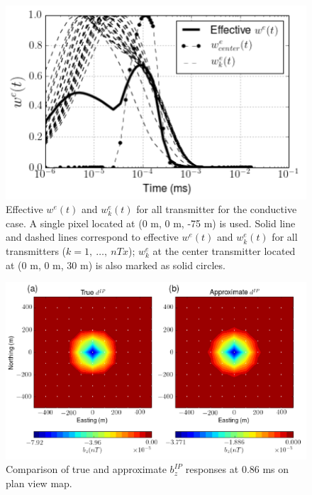 \documentclass[a4paper, 11pt]{article}
\begin{document}
\begin{figure}[htb]
  \centering
  \includegraphics[width=1.\textwidth]{figures/AveragedWe.png}
  \caption{Effective $w^e(t)$ and $w^e_k(t)$ for all transmitter for the conductive case. A single pixel located at (0 m, 0 m, -75 m) is used.  Solid line and dashed lines correspond to effective $w^e(t)$ and $w^e_k(t)$ for all transmitters ($k=1,\ \ldots,\ nTx$); $w^e_k$ at the center transmitter located at (0 m, 0 m, 30 m) is also marked as solid circles. }
  \label{F:AveragedWe}
\end{figure}
\clearpage

\begin{figure}[htb]
  \centering
  \includegraphics[width=1.\textwidth]{figures/EquivPeta_True_Approx.png}
  \caption{Comparison of true and approximate $b_z^{IP}$ responses at 0.86 ms on plan view map. }
  \label{F:EquivPeta_True_Approx}
\end{figure}
\clearpage

\end{document}
